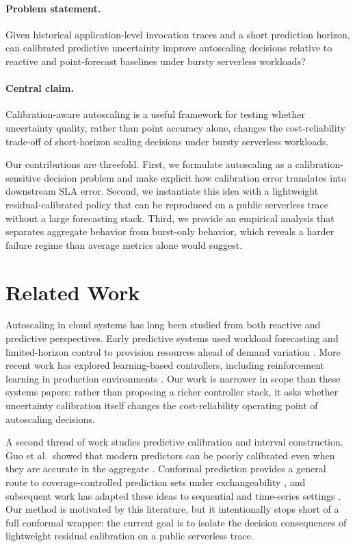 \documentclass[11pt]{article}
\theoremstyle{plain}
\theoremstyle{definition}
\theoremstyle{remark}
\begin{document}
\paragraph{Problem statement.}
Given historical application-level invocation traces and a short prediction horizon, can calibrated predictive uncertainty improve autoscaling decisions relative to reactive and point-forecast baselines under bursty serverless workloads?

\paragraph{Central claim.}
Calibration-aware autoscaling is a useful framework for testing whether uncertainty quality, rather than point accuracy alone, changes the cost-reliability trade-off of short-horizon scaling decisions under bursty serverless workloads.

Our contributions are threefold. First, we formulate autoscaling as a calibration-sensitive decision problem and make explicit how calibration error translates into downstream SLA error. Second, we instantiate this idea with a lightweight residual-calibrated policy that can be reproduced on a public serverless trace without a large forecasting stack. Third, we provide an empirical analysis that separates aggregate behavior from burst-only behavior, which reveals a harder failure regime than average metrics alone would suggest.

\section{Related Work}
Autoscaling in cloud systems has long been studied from both reactive and predictive perspectives. Early predictive systems used workload forecasting and limited-horizon control to provision resources ahead of demand variation \cite{roy2011efficient,gandhi2014adaptive}. More recent work has explored learning-based controllers, including reinforcement learning in production environments \cite{qiu2023aware}. Our work is narrower in scope than these systems papers: rather than proposing a richer controller stack, it asks whether uncertainty calibration itself changes the cost-reliability operating point of autoscaling decisions.

A second thread of work studies predictive calibration and interval construction. Guo et al.\ showed that modern predictors can be poorly calibrated even when they are accurate in the aggregate \cite{guo2017calibration}. Conformal prediction provides a general route to coverage-controlled prediction sets under exchangeability \cite{shafer2008tutorial}, and subsequent work has adapted these ideas to sequential and time-series settings \cite{xu2021conformal}. Our method is motivated by this literature, but it intentionally stops short of a full conformal wrapper: the current goal is to isolate the decision consequences of lightweight residual calibration on a public serverless trace.
\end{document}
